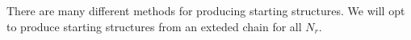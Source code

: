 There are many different methods for producing starting structures. We will opt to produce starting structures from an exteded chain for all $N_r$. 